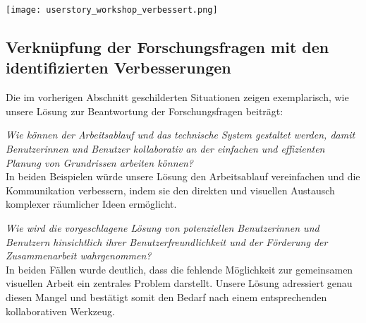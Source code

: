 \texttt{[image: userstory\_workshop\_verbessert.png]}
\pagebreak

\subsection{Verknüpfung der Forschungsfragen mit den identifizierten Verbesserungen}
Die im vorherigen Abschnitt geschilderten Situationen zeigen exemplarisch, wie unsere Lösung zur Beantwortung der Forschungsfragen beiträgt:

\vspace{0.5em}
\textit{Wie können der Arbeitsablauf und das technische System gestaltet werden, damit Benutzerinnen und Benutzer kollaborativ an der einfachen und effizienten Planung von Grundrissen arbeiten können?}\\
In beiden Beispielen würde unsere Lösung den Arbeitsablauf vereinfachen und die Kommunikation verbessern, indem sie den direkten und visuellen Austausch komplexer räumlicher Ideen ermöglicht.

\vspace{0.5em}
\textit{Wie wird die vorgeschlagene Lösung von potenziellen Benutzerinnen und Benutzern hinsichtlich ihrer Benutzerfreundlichkeit und der Förderung der Zusammenarbeit wahrgenommen?}\\
In beiden Fällen wurde deutlich, dass die fehlende Möglichkeit zur gemeinsamen visuellen Arbeit ein zentrales Problem darstellt. Unsere Lösung adressiert genau diesen Mangel und bestätigt somit den Bedarf nach einem entsprechenden kollaborativen Werkzeug.
